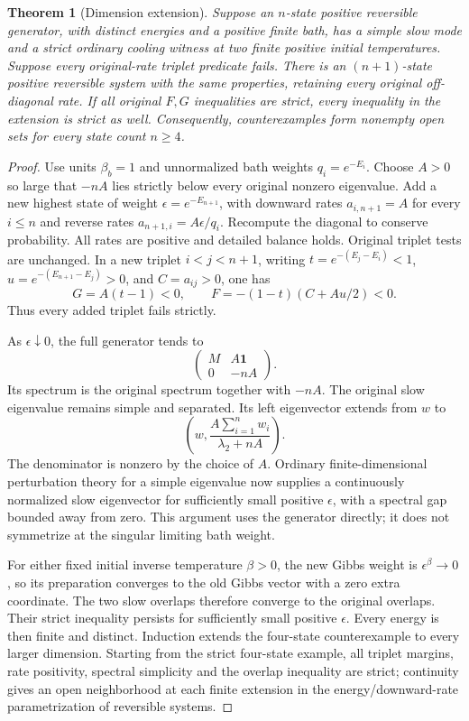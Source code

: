 \documentclass[11pt]{article}
\newtheorem{theorem}{Theorem}
\begin{document}
\begin{theorem}[Dimension extension]\label{thm:extension}
Suppose an $n$-state positive reversible generator, with distinct energies
and a positive finite bath, has a simple slow mode and a strict ordinary
cooling witness at two finite positive initial temperatures. Suppose every
original-rate triplet predicate fails. There is an $(n+1)$-state positive
reversible system with the same properties, retaining every original
off-diagonal rate. If all original $F,G$ inequalities are strict, every
inequality in the extension is strict as well. Consequently, counterexamples
form nonempty open sets for every state count $n\geq4$.
\end{theorem}
\begin{proof}
Use units $\beta_b=1$ and unnormalized bath weights $q_i=e^{-E_i}$.
Choose $A>0$ so large that $-nA$ lies strictly below every original nonzero
eigenvalue. Add a new highest state of weight $\epsilon=e^{-E_{n+1}}$,
with downward rates $a_{i,n+1}=A$ for every $i\leq n$ and reverse rates
$a_{n+1,i}=A\epsilon/q_i$. Recompute the diagonal to conserve probability.
All rates are positive and detailed balance holds. Original triplet tests
are unchanged. In a new triplet $i<j<n+1$, writing
$t=e^{-(E_j-E_i)}<1$, $u=e^{-(E_{n+1}-E_j)}>0$, and $C=a_{ij}>0$, one has
\[
G=A(t-1)<0,\qquad F=-(1-t)(C+Au/2)<0.
\]
Thus every added triplet fails strictly.

As $\epsilon\downarrow0$, the full generator tends to
\[
\begin{pmatrix}M&A\mathbf1\\0&-nA\end{pmatrix}.
\]
Its spectrum is the original spectrum together with $-nA$. The original
slow eigenvalue remains simple and separated. Its left eigenvector extends
from $w$ to
\[
\left(w,\frac{A\sum_{i=1}^n w_i}{\lambda_2+nA}\right).
\]
The denominator is nonzero by the choice of $A$. Ordinary finite-dimensional
perturbation theory for a simple eigenvalue now supplies a continuously
normalized slow eigenvector for sufficiently small positive $\epsilon$,
with a spectral gap bounded away from zero. This argument uses the generator
directly; it does not symmetrize at the singular limiting bath weight.

For either fixed initial inverse temperature $\beta>0$, the new Gibbs
weight is $\epsilon^\beta\to0$, so its preparation converges to the old
Gibbs vector with a zero extra coordinate. The two slow overlaps therefore
converge to the original overlaps. Their strict inequality persists for
sufficiently small positive $\epsilon$. Every energy is then finite and
distinct. Induction extends the four-state counterexample to every larger
dimension. Starting from the strict four-state example, all triplet margins,
rate positivity, spectral simplicity and the overlap inequality are strict;
continuity gives an open neighborhood at each finite extension in the
energy/downward-rate parametrization of reversible systems.
\end{proof}
\end{document}
